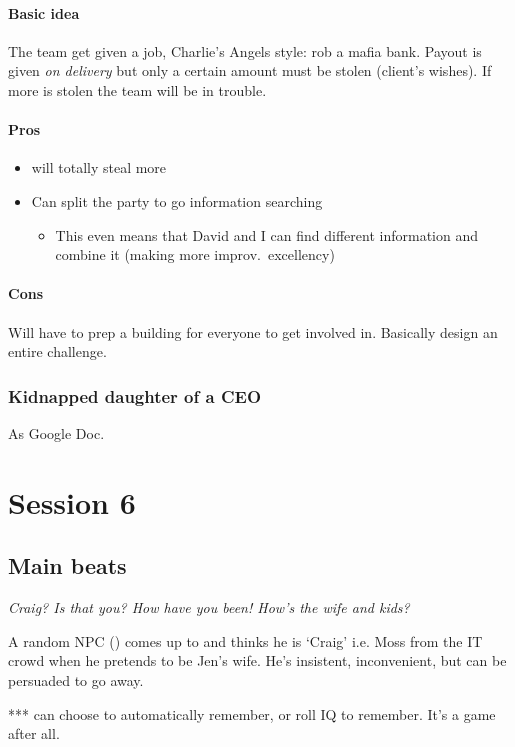 \paragraph{Basic idea}

The team get given a job, Charlie's Angels style: rob a mafia bank. Payout is
given \emph{on delivery} but only a certain amount must be stolen (client's
wishes). If more is stolen the team will be in trouble.

\paragraph{Pros}

\begin{itemize}
\item {} will totally steal more
\item Can split the party to go information searching
  \begin{itemize}
  \item This even means that David and I can find different information and
    combine it (making more improv.\ excellency)
  \end{itemize}
\end{itemize}

\paragraph{Cons}

Will have to prep a building for everyone to get involved in. Basically design
an entire challenge.

\subsubsection{Kidnapped daughter of a CEO}
\label{sec:kidn-daught-ceo}

As Google Doc.


\section{Session 6}
\label{sec:session-6}

\subsection{Main beats}
\label{sec:main-beats}

\begin{tcolorbox}[title={Oh, that's wierd!}, parbox=false]
  \emph{Craig? Is that you? How have you been! How's the wife and kids?}

  A random NPC () comes up to  and thinks he
  is `Craig' i.e. Moss from the IT crowd when he pretends to be Jen's wife. He's
  insistent, inconvenient, but can be persuaded to go away.

  \medskip

  ***  can choose to automatically remember, or roll IQ to remember. It's a game after all.
\end{tcolorbox}

